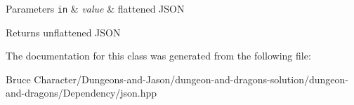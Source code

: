 \begin{DoxyParams}[1]{Parameters}
\mbox{\tt in}  & {\em value} & flattened J\+S\+ON\\
\hline
\end{DoxyParams}
\begin{DoxyReturn}{Returns}
unflattened J\+S\+ON 
\end{DoxyReturn}


The documentation for this class was generated from the following file\+:\begin{DoxyCompactItemize}
\item 
Bruce Character/\+Dungeons-\/and-\/\+Jason/dungeon-\/and-\/dragons-\/solution/dungeon-\/and-\/dragons/\+Dependency/json.\+hpp\end{DoxyCompactItemize}
